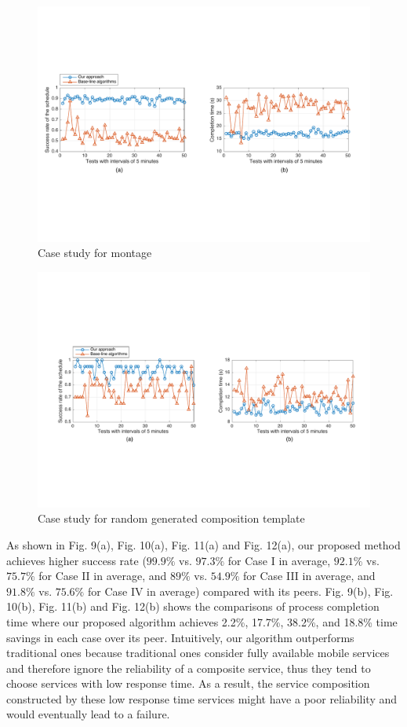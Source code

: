 \documentclass[journal]{IEEEtran}
\begin{document}
\begin{figure}[!t]
\centering
\includegraphics[width=6.6in]{./img/Task-24.pdf}
\caption{Case study for montage}
\label{Task-24}
\end{figure}
\begin{figure}[!t]
\centering
\includegraphics[width=6.6in]{./img/Task-12-random.pdf}
\caption{Case study for random generated composition template}
\label{Task-random}
\end{figure}

As shown in Fig. 9(a), Fig. 10(a), Fig. 11(a) and Fig. 12(a), our proposed method achieves higher success rate ($99.9\%$ vs. $97.3\%$ for Case I in average, $92.1\%$ vs. $75.7\%$ for Case II in average, and $89\%$ vs. $54.9\%$ for Case III in average, and $91.8\%$ vs. $75.6\%$ for Case IV in average) compared with its peers.
Fig. 9(b), Fig. 10(b), Fig. 11(b) and Fig. 12(b) shows the comparisons of process completion time where our proposed algorithm achieves 2.2\%, 17.7\%, 38.2\%, and 18.8\% time savings in each case over its peer. 
Intuitively, our algorithm outperforms traditional ones because traditional ones consider fully available mobile services and therefore ignore the reliability of a composite service, thus they tend to choose services with low response time. As a result, the service composition constructed by these low response time services might have a poor reliability and would eventually lead to a failure.
\end{document}
